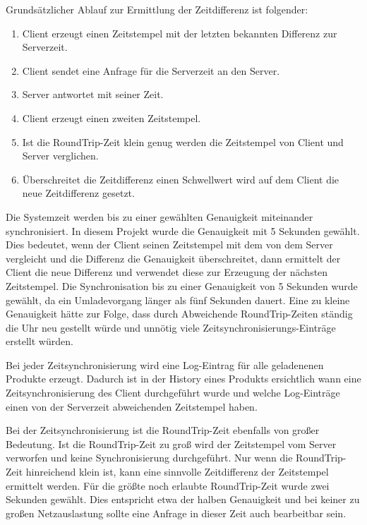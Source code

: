 Grundsätzlicher Ablauf zur Ermittlung der Zeitdifferenz ist folgender:

\begin{enumerate}
	\item Client erzeugt einen Zeitstempel mit der letzten bekannten
		Differenz zur Serverzeit.
	\item Client sendet eine Anfrage für die Serverzeit an den Server.
	\item Server antwortet mit seiner Zeit.
	\item Client erzeugt einen zweiten Zeitstempel.
	\item Ist die RoundTrip-Zeit klein genug werden die Zeitstempel
		von Client und Server verglichen.
	\item Überschreitet die Zeitdifferenz einen Schwellwert wird auf
		dem Client die neue Zeitdifferenz gesetzt.
\end{enumerate}

Die Systemzeit werden bis zu einer gewählten Genauigkeit miteinander synchronisiert.
	In diesem Projekt wurde die Genauigkeit mit 5 Sekunden gewählt. Dies bedeutet,
	wenn der Client seinen Zeitstempel mit dem von dem Server vergleicht und die
	Differenz die Genauigkeit überschreitet, dann ermittelt der Client die neue
	Differenz und verwendet diese zur Erzeugung der nächsten Zeitstempel. Die
	Synchronisation bis zu einer Genauigkeit von 5 Sekunden wurde gewählt, da ein
	Umladevorgang länger als fünf Sekunden dauert. Eine zu kleine Genauigkeit
	hätte zur Folge, dass durch Abweichende RoundTrip-Zeiten ständig die Uhr neu
	gestellt würde und unnötig viele Zeitsynchronisierungs-Einträge erstellt würden.
	
Bei jeder Zeitsynchronisierung wird eine Log-Eintrag für alle geladenenen Produkte erzeugt.
	Dadurch ist in der History eines Produkts ersichtlich wann eine Zeitsynchronisierung
	des Client durchgeführt wurde und welche Log-Einträge einen von der Serverzeit
	abweichenden Zeitstempel haben.

Bei der Zeitsynchronisierung ist die RoundTrip-Zeit ebenfalls von großer Bedeutung.
	Ist die RoundTrip-Zeit zu groß wird der Zeitstempel vom Server verworfen und keine
	Synchronisierung durchgeführt. Nur wenn die RoundTrip-Zeit hinreichend klein ist,
	kann eine sinnvolle Zeitdifferenz der Zeitstempel ermittelt werden. Für die größte
	noch erlaubte RoundTrip-Zeit wurde zwei Sekunden gewählt. Dies entspricht etwa
	der halben Genauigkeit und bei keiner zu großen Netzauslastung sollte eine Anfrage
	in dieser Zeit auch bearbeitbar sein.

